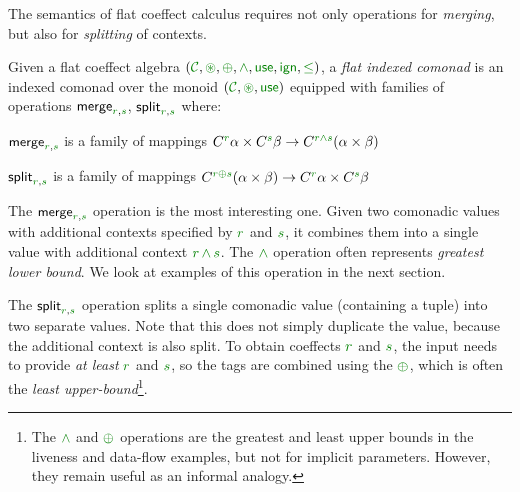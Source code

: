 The semantics of flat coeffect calculus requires not only operations for \emph{merging}, but also for
\emph{splitting} of contexts.

\begin{definition}
Given a flat coeffect algebra $(\C, \cseq, \cpar, \czip, \cunit, \czero, \cleq)$,
a \emph{flat indexed comonad} is an indexed comonad over the monoid $(\C, \cseq, \cunit)$
equipped with families of operations $\ident{merge}_{\cclrd{r},\cclrd{s}}$, $\ident{split}_{\cclrd{r},\cclrd{s}}$ where:
%
\begin{compactitem}
\item $\ident{merge}_{\cclrd{r},\cclrd{s}}$ is a family of mappings
  $\ctyp{\cclrd{r}}{\alpha} \times \ctyp{\cclrd{s}}{\beta} \rightarrow \ctyp{\cclrd{r}\czip\cclrd{s}}{(\alpha \times \beta)}$
\item $\ident{split}_{\cclrd{r},\cclrd{s}}$ is a family of mappings
  $\ctyp{\cclrd{r}\cpar\cclrd{s}}{(\alpha \times \beta)} \rightarrow \ctyp{\cclrd{r}}{\alpha} \times \ctyp{\cclrd{s}}{\beta}$
\end{compactitem}
\end{definition}

\noindent
The $\ident{merge}_{\cclrd{r},\cclrd{s}}$ operation is the most interesting one. Given two comonadic
values with additional contexts specified by $\cclrd{r}$ and $\cclrd{s}$, it combines them into a
single value with additional context $\cclrd{r}\,\czip\,\cclrd{s}$. The $\czip$ operation often represents
\emph{greatest lower bound}. We look at examples of this operation in the next section.

The $\ident{split}_{\cclrd{r},\cclrd{s}}$ operation splits a single comonadic value (containing a tuple)
into two separate values. Note that this does not simply duplicate the value, because the additional
context is also split. To obtain coeffects $\cclrd{r}$ and $\cclrd{s}$, the input needs to provide
\emph{at least} $\cclrd{r}$ and $\cclrd{s}$, so the tags are combined using the $\cpar$, which is often
the \emph{least upper-bound}\footnote{The $\czip$ and $\cpar$ operations are the greatest and least upper
bounds in the liveness and data-flow examples, but not for implicit parameters. However, they remain useful
as an informal analogy.}.

